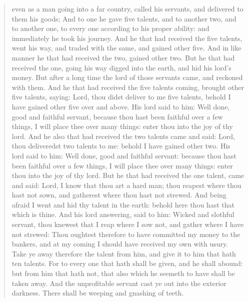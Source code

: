 \begin{quote}
	even as a man going into a far country, called his servants, and delivered to them his goods; And to one he gave five talents, and to another two, and to another one, to every one according to his proper ability: and immediately he took his journey. And he that had received the five talents, went his way, and traded with the same, and gained other five. And in like manner he that had received the two, gained other two. But he that had received the one, going his way digged into the earth, and hid his lord's money. But after a long time the lord of those servants came, and reckoned with them. And he that had received the five talents coming, brought other five talents, saying: Lord, thou didst deliver to me five talents, behold I have gained other five over and above. His lord said to him: Well done, good and faithful servant, because thou hast been faithful over a few things, I will place thee over many things: enter thou into the joy of thy lord. And he also that had received the two talents came and said: Lord, thou deliveredst two talents to me: behold I have gained other two. His lord said to him: Well done, good and faithful servant: because thou hast been faithful over a few things, I will place thee over many things: enter thou into the joy of thy lord. But he that had received the one talent, came and said: Lord, I know that thou art a hard man; thou reapest where thou hast not sown, and gatherest where thou hast not strewed. And being afraid I went and hid thy talent in the earth: behold here thou hast that which is thine. And his lord answering, said to him: Wicked and slothful servant, thou knewest that I reap where I sow not, and gather where I have not strewed: Thou oughtest therefore to have committed my money to the bankers, and at my coming I should have received my own with usury. Take ye away therefore the talent from him, and give it to him that hath ten talents. For to every one that hath shall be given, and he shall abound: but from him that hath not, that also which he seemeth to have shall be taken away. And the unprofitable servant cast ye out into the exterior darkness. There shall be weeping and gnashing of teeth.
\end{quote}
\medskip

